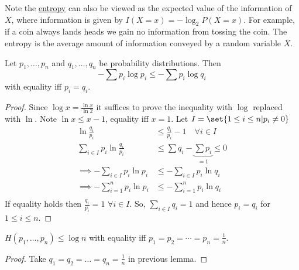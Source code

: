 \documentclass{article}
\begin{document}
Note the \hyperlink{def:entropy}{entropy} can also be viewed as the expected value of the information of $X$, where information is given by $I(X=x) = -\log_2 P(X=x)$.
For example, if a coin always lands heads we gain no information from tossing the coin.
The entropy is the average amount of information conveyed by a random variable $X$.

\begin{nlemma}\label{lem:gibbs}
    Let $p_1, \dotsc, p_n$ and $q_1, \dotsc, q_n$ be probability distributions. Then
    \begin{equation*}
        -\sum p_i \log p_i \leq -\sum p_i \log q_i
    \end{equation*}
    with equality iff $p_i = q_i$.
\end{nlemma}
\begin{proof}
    Since $\log x = \frac{\ln x}{\ln 2}$ it suffices to prove the inequality with $\log$ replaced with $\ln$.
    Note $\ln x \leq x - 1$, equality iff $x=1$.
    Let $I = \set{1 \leq i \leq n | p_i \neq 0}$
    \begin{align*}
        \ln \frac{q_i}{p_i} &\leq \frac{q_i}{p_i} - 1 \quad \forall i \in I \\
        \sum_{i \in I} p_i \ln \frac{q_i}{p_i} &\leq \sum q_i - \underbrace{\sum p_i}_{=1} \leq 0 \\
        \implies -\sum_{i \in I} p_i \ln p_i &\leq -\sum_{i \in I} p_i \ln q_i \\
        \implies -\sum_{i =1}^n p_i \ln p_i &\leq -\sum_{i =1}^n p_i \ln q_i \\
    \end{align*}
    If equality holds then $\frac{q_i}{p_i} = 1$ $\forall i \in I$. So, $\sum_{i \in I} q_i = 1$ and hence $p_i = q_i$ for $1 \leq i \leq n$.
\end{proof}

\begin{cor}
    $H(p_1, \dotsc, p_n) \leq \log n$ with equality iff $p_1 = p_2 = \dotsb = p_n = \frac{1}{n}$.
\end{cor}
\begin{proof}
    Take $q_1 = q_2 = \dotsc = q_n = \frac{1}{n}$ in previous lemma.
\end{proof}
\end{document}
